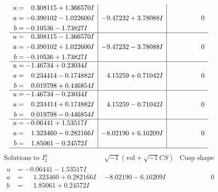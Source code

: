 \documentclass[1p]{elsarticle_modified}
\theoremstyle{definition}
\newcommand{\I}{\sqrt{-1}}
\begin{document}
$$\begin{array}{c|c|c}
\begin{aligned}
u &= \phantom{-}0.308115 + 1.366570 I \\
a &= -0.390102 - 1.022600 I \\
b &= -0.10536 - 1.73827 I\end{aligned}
 & -9.47232 + 3.78088 I & \phantom{-0.000000 } 0 \\ \hline\begin{aligned}
u &= \phantom{-}0.308115 - 1.366570 I \\
a &= -0.390102 + 1.022600 I \\
b &= -0.10536 + 1.73827 I\end{aligned}
 & -9.47232 - 3.78088 I & \phantom{-0.000000 } 0 \\ \hline\begin{aligned}
u &= -1.46734 + 0.23034 I \\
a &= \phantom{-}0.234414 - 0.174882 I \\
b &= \phantom{-}0.019798 + 0.446854 I\end{aligned}
 & \phantom{-}4.15259 + 0.71042 I & \phantom{-0.000000 } 0 \\ \hline\begin{aligned}
u &= -1.46734 - 0.23034 I \\
a &= \phantom{-}0.234414 + 0.174882 I \\
b &= \phantom{-}0.019798 - 0.446854 I\end{aligned}
 & \phantom{-}4.15259 - 0.71042 I & \phantom{-0.000000 } 0 \\ \hline\begin{aligned}
u &= -0.06441 + 1.53517 I \\
a &= \phantom{-}1.323460 - 0.282166 I \\
b &= \phantom{-}1.85061 - 0.24572 I\end{aligned}
 & -8.02190 + 6.16209 I & \phantom{-0.000000 } 0\\
 \hline 
 \end{array}$$\newpage$$\begin{array}{c|c|c}  
\text{Solutions to }I^u_{2}& \I (\text{vol} + \sqrt{-1}CS) & \text{Cusp shape}\\
 \hline 
\begin{aligned}
u &= -0.06441 - 1.53517 I \\
a &= \phantom{-}1.323460 + 0.282166 I \\
b &= \phantom{-}1.85061 + 0.24572 I\end{aligned}
 & -8.02190 - 6.16209 I & \phantom{-0.000000 } 0 \\ \hline\begin{aligned}

\end{aligned}
\end{array}$$
\end{document}
